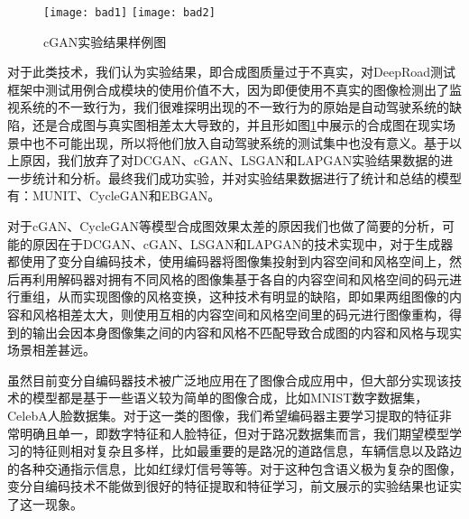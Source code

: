 \begin{figure}[h]
    \centering
    \texttt{[image: bad1]}
    \texttt{[image: bad2]}
    \caption{cGAN实验结果样例图}
    \label{bad-res}
\end{figure}

对于此类技术，我们认为实验结果，即合成图质量过于不真实，对DeepRoad测试框架中测试用例合成模块的使用价值不大，因为即便使用不真实的图像检测出了监视系统的不一致行为，我们很难探明出现的不一致行为的原始是自动驾驶系统的缺陷，还是合成图与真实图相差太大导致的，并且形如图\ref{bad-res}中展示的合成图在现实场景中也不可能出现，所以将他们放入自动驾驶系统的测试集中也没有意义。基于以上原因，我们放弃了对DCGAN、cGAN、LSGAN和LAPGAN实验结果数据的进一步统计和分析。最终我们成功实验，并对实验结果数据进行了统计和总结的模型有：MUNIT、CycleGAN和EBGAN。

对于cGAN、CycleGAN等模型合成图效果太差的原因我们也做了简要的分析，可能的原因在于DCGAN、cGAN、LSGAN和LAPGAN的技术实现中，对于生成器都使用了变分自编码技术\cite{vae}，使用编码器将图像集投射到内容空间和风格空间上，然后再利用解码器对拥有不同风格的图像集基于各自的内容空间和风格空间的码元进行重组，从而实现图像的风格变换，这种技术有明显的缺陷，即如果两组图像的内容和风格相差太大，则使用互相的内容空间和风格空间里的码元进行图像重构，得到的输出会因本身图像集之间的内容和风格不匹配导致合成图的内容和风格与现实场景相差甚远。 

虽然目前变分自编码器技术被广泛地应用在了图像合成应用中，但大部分实现该技术的模型都是基于一些语义较为简单的图像合成，比如MNIST数字数据集，CelebA人脸数据集。对于这一类的图像，我们希望编码器主要学习提取的特征非常明确且单一，即数字特征和人脸特征，但对于路况数据集而言，我们期望模型学习的特征则相对复杂且多样，比如最重要的是路况的道路信息，车辆信息以及路边的各种交通指示信息，比如红绿灯信号等等。对于这种包含语义极为复杂的图像，变分自编码技术不能做到很好的特征提取和特征学习\cite{vae}，前文展示的实验结果也证实了这一现象。

